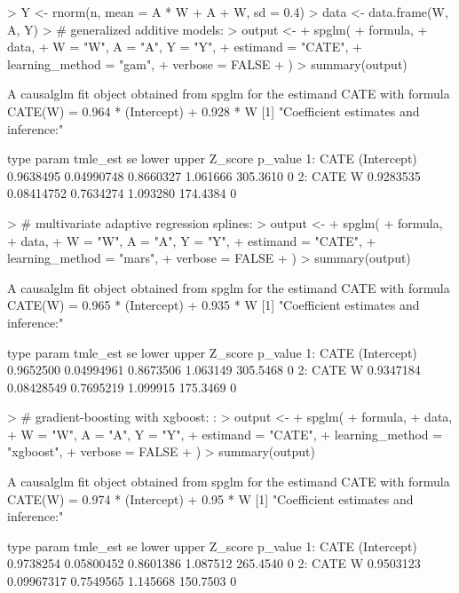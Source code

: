 \documentclass[article]{jss}
\begin{document}
\begin{Schunk}
\begin{Sinput}
> Y <- rnorm(n, mean = A * W + A + W, sd = 0.4)
> data <- data.frame(W, A, Y)
> # generalized additive models:
> output <-
+   spglm(
+     formula,
+     data,
+     W = "W", A = "A", Y = "Y",
+     estimand = "CATE",
+     learning_method = "gam",
+     verbose = FALSE
+   )
> summary(output)
\end{Sinput}
\begin{Soutput}
A causalglm fit object obtained from spglm for the estimand CATE with formula 
CATE(W) = 0.964 * (Intercept) + 0.928 * W
[1] "Coefficient estimates and inference:"

   type       param  tmle_est         se     lower    upper  Z_score p_value
1: CATE (Intercept) 0.9638495 0.04990748 0.8660327 1.061666 305.3610       0
2: CATE           W 0.9283535 0.08414752 0.7634274 1.093280 174.4384       0
\end{Soutput}
\begin{Sinput}
> # multivariate adaptive regression splines:
> output <-
+   spglm(
+     formula,
+     data,
+     W = "W", A = "A", Y = "Y",
+     estimand = "CATE",
+     learning_method = "mars",
+     verbose = FALSE
+   )
> summary(output)
\end{Sinput}
\begin{Soutput}
A causalglm fit object obtained from spglm for the estimand CATE with formula 
CATE(W) = 0.965 * (Intercept) + 0.935 * W
[1] "Coefficient estimates and inference:"

   type       param  tmle_est         se     lower    upper  Z_score p_value
1: CATE (Intercept) 0.9652500 0.04994961 0.8673506 1.063149 305.5468       0
2: CATE           W 0.9347184 0.08428549 0.7695219 1.099915 175.3469       0
\end{Soutput}
\begin{Sinput}
> # gradient-boosting with xgboost: :
> output <-
+   spglm(
+     formula,
+     data,
+     W = "W", A = "A", Y = "Y",
+     estimand = "CATE",
+     learning_method = "xgboost",
+     verbose = FALSE
+   )
> summary(output)
\end{Sinput}
\begin{Soutput}
A causalglm fit object obtained from spglm for the estimand CATE with formula 
CATE(W) = 0.974 * (Intercept) + 0.95 * W
[1] "Coefficient estimates and inference:"

   type       param  tmle_est         se     lower    upper  Z_score p_value
1: CATE (Intercept) 0.9738254 0.05800452 0.8601386 1.087512 265.4540       0
2: CATE           W 0.9503123 0.09967317 0.7549565 1.145668 150.7503       0
\end{Soutput}
\end{Schunk}
\end{document}
